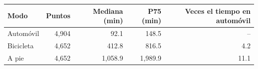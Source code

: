 \begin{tabular}{lrrrr}
\toprule
Modo & Puntos & Mediana (min) & P75 (min) & Veces el tiempo en automóvil \\
\midrule
Automóvil & 4,904 & 92.1 & 148.5 & -- \\
Bicicleta & 4,652 & 412.8 & 816.5 & 4.2 \\
A pie & 4,652 & 1,058.9 & 1,989.9 & 11.1 \\
\bottomrule
\end{tabular}
